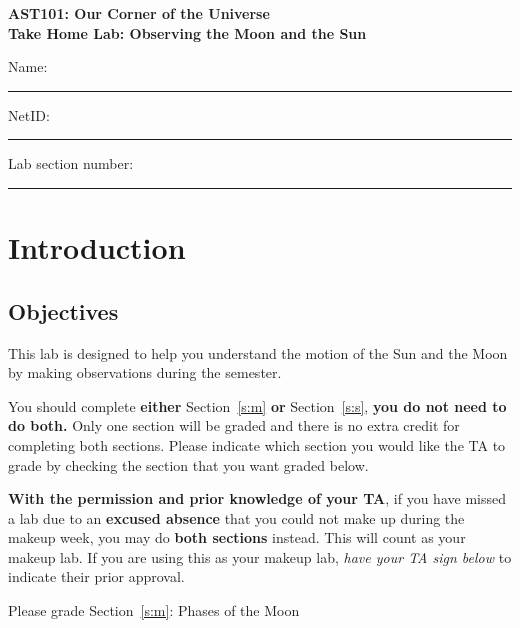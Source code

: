 \documentclass[11pt]{article}
\begin{document}
\begin{center}
\textbf{\Large
AST101: Our Corner of the Universe \\
\vspace*{0.1cm}
Take Home Lab: Observing the  Moon and the Sun
}
\end{center}

\vspace*{0.5cm}

{\Large Name:}\vspace*{0.5cm}\\\hrule
{\Large NetID:}\vspace*{0.5cm}\\\hrule
{\Large Lab section number:}\vspace*{0.5cm}\\\hrule
\vspace*{0.5cm}


\vspace*{-0.5cm}
\section{Introduction}

\subsection*{Objectives} 

This lab is designed to help you understand the motion of the Sun and the Moon
by making observations during the semester.

You should complete \textbf{either} Section~\ref{s:m} \textbf{or}
Section~\ref{s:s}, \textbf{you do not need to do both.} Only one section will
be graded and there is no extra credit for completing both sections. Please
indicate which section you would like the TA to grade by checking the section
that you want graded below.

{\bf With the permission and prior knowledge of your TA}, if you have missed
a lab due to an {\bf excused absence} that you could not make up
during the makeup week, you may do {\bf both sections} instead.
This will count as your makeup lab. If you are using this as your makeup lab,
{\it have your TA sign below} to indicate their prior approval.

\vspace*{0.5cm}
\noindent
Please grade Section~\ref{s:m}: Phases of the Moon \hrulefill\hspace*{6cm}\\
\end{document}
